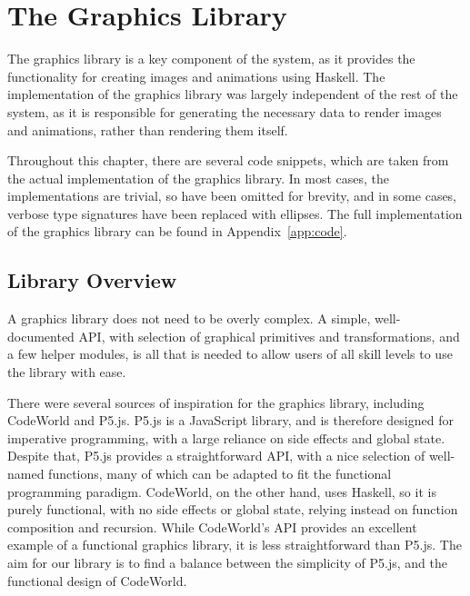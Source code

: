 \documentclass[../main.tex]{subfiles}
\begin{document}
\chapter{The Graphics Library} \label{ch:graphics}
    The graphics library is a key component of the system, as it provides the
        functionality for creating images and animations using Haskell.
    The implementation of the graphics library was largely independent of the rest
        of the system, as it is responsible for generating the necessary data to render
        images and animations, rather than rendering them itself.

    Throughout this chapter, there are several code snippets, which are taken from
        the actual implementation of the graphics library.
    In most cases, the implementations are trivial, so have been omitted for
        brevity, and in some cases, verbose type signatures have been replaced with
        ellipses.
    The full implementation of the graphics library can be found in
        Appendix~\ref{app:code}.

    \section{Library Overview}
        A graphics library does not need to be overly complex.
        A simple, well-documented API, with selection of graphical primitives and
            transformations, and a few helper modules, is all that is needed to allow users
            of all skill levels to use the library with ease.

        There were several sources of inspiration for the graphics library, including
            CodeWorld and P5.js.
        P5.js is a JavaScript library, and is therefore designed for imperative
            programming, with a large reliance on side effects and global state.
        Despite that, P5.js provides a straightforward API, with a nice selection of
            well-named functions, many of which can be adapted to fit the functional
            programming paradigm.
        CodeWorld, on the other hand, uses Haskell, so it is purely functional, with no
            side effects or global state, relying instead on function composition and
            recursion.
        While CodeWorld's API provides an excellent example of a functional graphics
            library, it is less straightforward than P5.js.
        The aim for our library is to find a balance between the simplicity of P5.js,
            and the functional design of CodeWorld.
\end{document}
